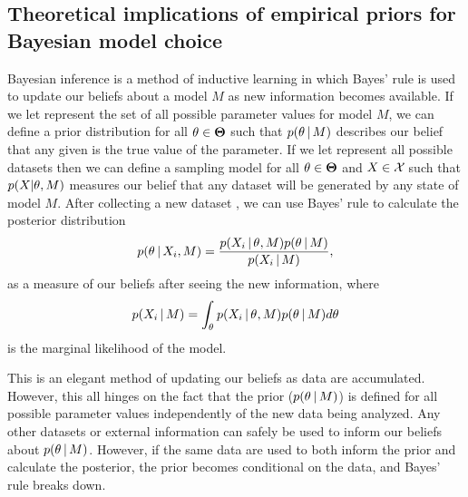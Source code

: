 \subsection{Theoretical implications of empirical priors for Bayesian model
choice}
\begin{linenomath}
Bayesian inference is a method of inductive learning in which Bayes' rule is
used to update our beliefs about a model $M$ as new information becomes
available.
If we let \allParameterValues represent the set of all possible parameter
values for model $M$, we can define a prior distribution for all $\theta \in
\boldsymbol{\Theta}$ such that $p(\theta \,|\, M)$ describes our belief that
any given \myTheta{} is the true value of the parameter.
If we let \allDatasets represent all possible datasets then we can 
define a sampling model for all $\theta \in
\boldsymbol{\Theta}$ and $\alignment{}{} \in \allDatasets$ such that
$p(\alignment{}{} | \theta, M)$ measures our belief that any dataset \alignment{}{}
will be generated by any state \myTheta{} of model $M$.
After collecting a new dataset , we can use Bayes' rule to
calculate the posterior distribution
\begin{equation}
    p(\myTheta{} \given \alignment{i}{}, M) = \frac{p(\alignment{i}{} \given
    \myTheta{}, M)p(\myTheta{} \given M)}{p(\alignment{i}{} \given M)},
    \label{eq:bayesrule}
\end{equation}
as a measure of our beliefs after seeing the new information, where
\begin{equation}
    p(\alignment{i}{} \given M) = \int_{\myTheta{}} p(\alignment{i}{} \given
    \myTheta{}, M)p(\myTheta{} \given M) d\myTheta{}
    \label{eq:marginallikelhiood}
\end{equation}
is the marginal likelihood of the model.
\end{linenomath}

This is an elegant method of updating our beliefs as data are accumulated.
However, this all hinges on the fact that the prior ($p(\theta_{} \,|\, M)$)
is defined for all possible parameter values independently of the new data
being analyzed.
Any other datasets or external information can safely be used to inform our
beliefs about $p(\theta_{} \,|\, M)$.
However, if the same data are used to both inform the prior and calculate the
posterior, the prior becomes conditional on the data, and Bayes' rule breaks
down.

